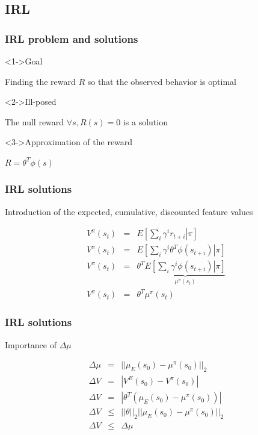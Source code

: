 \documentclass{beamer}
\begin{document}
\subsection{IRL}
\label{sec-2_2}
\begin{frame}
\frametitle{IRL problem and solutions}
\label{sec-2_2_1}
\begin{block}<1->{Goal}
\label{sec-2_2_1_1}

     Finding the reward $R$ so that the observed behavior is optimal
\end{block}
\begin{alertblock}<2->{Ill-posed}
\label{sec-2_2_1_2}

     The null reward $\forall s, R(s) = 0$ is a solution
\end{alertblock}
\begin{block}<3->{Approximation of the reward}
\label{sec-2_2_1_3}

     $R = \theta^T\phi(s)$
\end{block}
\end{frame}
\begin{frame}
\frametitle{IRL solutions}
\label{sec-2_2_2}
\begin{block}{Introduction of the expected, cumulative, discounted feature values}
\label{sec-2_2_2_1}

     \scriptsize
     \begin{eqnarray*}
     V^\pi(s_t) &=& E\left[\left.\sum\limits_{i}\gamma^i r_{t+i}\right|\pi\right]\\
     V^\pi(s_t) &=& E\left[\left.\sum\limits_{i}\gamma^i \theta^T\phi(s_{t+i})\right|\pi\right]\\
     V^\pi(s_t) &=& \theta^T\underbrace{E\left[\left.\sum\limits_{i}\gamma^i \phi(s_{t+i})\right|\pi\right]}_{\mu^\pi(s_t)}\\
     V^\pi(s_t) &=& \theta^T\mu^\pi(s_t)
     \end{eqnarray*}
\end{block}
\end{frame}
\begin{frame}
\frametitle{IRL solutions}
\label{sec-2_2_3}
\begin{block}{Importance of $\Delta\mu$}
\label{sec-2_2_3_1}

     \begin{eqnarray*}
     \Delta\mu &=& ||\mu_E(s_0) - \mu^\pi(s_0)||_2\\
     \Delta V &=& |V^E(s_0) - V^\pi(s_0)|\\
     \Delta V &=& |\theta^T\left(\mu_E(s_0) - \mu^\pi(s_0)\right)|\\
     \Delta V &\leq& ||\theta||_2||\mu_E(s_0) - \mu^\pi(s_0)||_2\\
     \Delta V &\leq& \Delta\mu\\
     \end{eqnarray*}
\end{block}
\end{frame}
\end{document}
